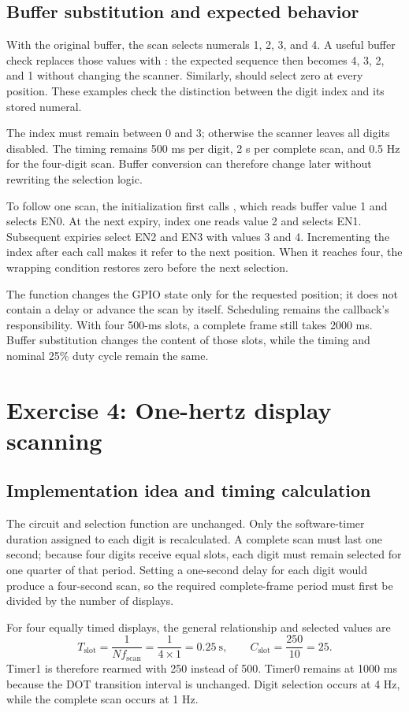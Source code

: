 \documentclass[a4paper]{article}
\newcommand{\code}[1]{\texttt{\detokenize{#1}}}
\newcommand{\topic}[1]{\subsection{#1}}
\begin{document}
\topic{Buffer substitution and expected behavior}
With the original buffer, the scan selects numerals 1, 2, 3, and 4. A useful
buffer check replaces those values with \code{{4, 3, 2, 1}}: the expected sequence
then becomes 4, 3, 2, and 1 without changing the scanner. Similarly,
\code{{0, 0, 0, 0}} should select zero at every position. These examples check
the distinction between the digit index and its stored numeral.

The index must remain between 0 and 3; otherwise the scanner leaves all digits
disabled. The timing remains 500 ms per digit, 2 s per complete scan, and
0.5 Hz for the four-digit scan. Buffer conversion can therefore change later
without rewriting the selection logic.

To follow one scan, the initialization first calls \code{update7SEG(0)},
which reads buffer value 1 and selects EN0. At the next expiry, index one
reads value 2 and selects EN1. Subsequent expiries select EN2 and EN3 with
values 3 and 4. Incrementing the index after each call makes it refer to the
next position. When it reaches four, the wrapping condition restores zero
before the next selection.

The function changes the GPIO state only for the requested position; it does
not contain a delay or advance the scan by itself. Scheduling remains the
callback's responsibility. With four 500-ms slots, a complete frame still
takes 2000 ms. Buffer substitution changes the content of those slots, while
the timing and nominal 25\% duty cycle remain the same.

\section{Exercise 4: One-hertz display scanning}
\topic{Implementation idea and timing calculation}
The circuit and selection function are unchanged. Only the software-timer
duration assigned to each digit is recalculated. A complete scan must last
one second; because four digits receive equal slots, each digit must remain
selected for one quarter of that period. Setting a one-second delay for each
digit would produce a four-second scan, so the required complete-frame period
must first be divided by the number of displays.

For four equally timed displays, the general relationship and selected values
are
\[
T_{\mathrm{slot}}=\frac{1}{Nf_{\mathrm{scan}}}
=\frac{1}{4\times1}=0.25\ \mathrm{s},\qquad
C_{\mathrm{slot}}=\frac{250}{10}=25.
\]
Timer1 is therefore rearmed with 250 instead of 500. Timer0 remains at 1000 ms
because the DOT transition interval is unchanged. Digit selection occurs at
4 Hz, while the complete scan occurs at 1 Hz.
\end{document}
